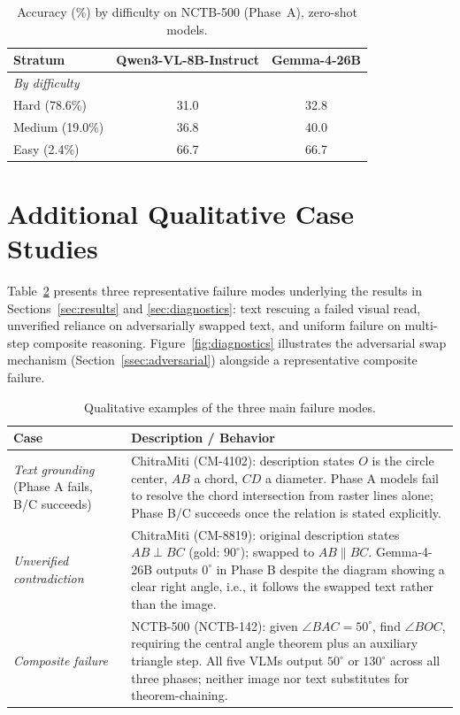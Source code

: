 \documentclass[11pt]{article}
\begin{document}
\begin{table}[ht]
\centering
\caption{Accuracy (\%) by difficulty on NCTB-500 (Phase~A), zero-shot models.}
\label{tab:error-breakdown}
\small
\begin{tabular}{l c c}
\toprule
\textbf{Stratum} & \textbf{Qwen3-VL-8B-Instruct} & \textbf{Gemma-4-26B} \\
\midrule
\multicolumn{3}{l}{\textit{By difficulty}} \\
Hard   (78.6\%) & 31.0 & 32.8 \\
Medium (19.0\%) & 36.8 & 40.0 \\
Easy   (\phantom{1}2.4\%) & 66.7 & 66.7 \\
\bottomrule
\end{tabular}
\end{table}

\section{Additional Qualitative Case Studies}
\label{app:qualitative}

Table~\ref{tab:cases} presents three representative failure modes underlying the results in Sections~\ref{sec:results} and \ref{sec:diagnostics}: text rescuing a failed visual read, unverified reliance on adversarially swapped text, and uniform failure on multi-step composite reasoning. Figure~\ref{fig:diagnostics} illustrates the adversarial swap mechanism (Section~\ref{ssec:adversarial}) alongside a representative composite failure.

\begin{table}[t]
\centering\small
\begin{tabular}{@{}p{2.6cm}p{12.5cm}@{}}
\toprule
\textbf{Case} & \textbf{Description / Behavior} \\
\midrule
\textit{Text grounding} (Phase A fails, B/C succeeds) &
ChitraMiti (CM-4102): description states $O$ is the circle center, $AB$ a chord, $CD$ a diameter. Phase A models fail to resolve the chord intersection from raster lines alone; Phase B/C succeeds once the relation is stated explicitly. \\[4pt]
\textit{Unverified contradiction} &
ChitraMiti (CM-8819): original description states $AB \perp BC$ (gold: $90^\circ$); swapped to $AB \parallel BC$. Gemma-4-26B outputs $0^\circ$ in Phase B despite the diagram showing a clear right angle, i.e., it follows the swapped text rather than the image. \\[4pt]
\textit{Composite failure} &
NCTB-500 (NCTB-142): given $\angle BAC = 50^\circ$, find $\angle BOC$, requiring the central angle theorem plus an auxiliary triangle step. All five VLMs output $50^\circ$ or $130^\circ$ across all three phases; neither image nor text substitutes for theorem-chaining. \\
\bottomrule
\end{tabular}
\caption{Qualitative examples of the three main failure modes.}
\label{tab:cases}
\end{table}
\end{document}
